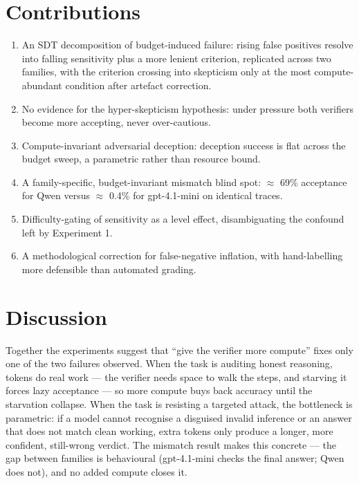 \documentclass[12pt, a4paper, oneside]{report}
\begin{document}
\chapter{Contributions}

\begin{enumerate}
	\item An SDT decomposition of budget-induced failure: rising false positives resolve into falling sensitivity
     plus a more lenient criterion, replicated across two families, with the criterion crossing into skepticism
     only at the most compute-abundant condition after artefact correction.
	\item No evidence for the hyper-skepticism hypothesis: under pressure both verifiers become more accepting, never over-cautious.
	\item Compute-invariant adversarial deception: deception success is flat across the budget sweep, a parametric rather than resource bound.
	\item A family-specific, budget-invariant mismatch blind spot: $\approx$ 69\% acceptance for Qwen versus $\approx$ 0.4\% for gpt-4.1-mini
     on identical traces.
	\item Difficulty-gating of sensitivity as a level effect, disambiguating the confound left by Experiment 1.
	\item A methodological correction for false-negative inflation, with hand-labelling more defensible than automated grading.
\end{enumerate}



\chapter{Discussion}

Together the experiments suggest that ``give the verifier more compute'' fixes only one of the 
two failures observed. When the task is auditing honest reasoning, tokens do real work --- the
 verifier needs space to walk the steps, and starving it forces lazy acceptance --- so more compute
  buys back accuracy until the starvation collapse. When the task is resisting a targeted attack, 
  the bottleneck is parametric: if a model cannot recognise a disguised invalid inference or an
   answer that does not match clean working, extra tokens only produce a longer, more confident,
    still-wrong verdict. The mismatch result makes this concrete --- the gap between families is
     behavioural (gpt-4.1-mini checks the final answer; Qwen does not), and no added compute closes it.
\end{document}
